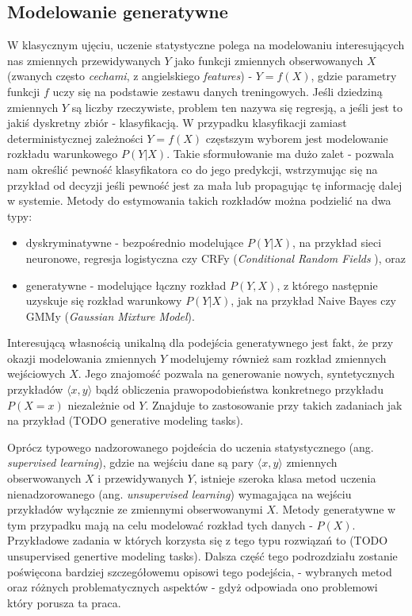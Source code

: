 \documentclass[magisterska]{pracamgr}
\renewcommand{\cite}{\citep}
\begin{document}
\subsection{Modelowanie generatywne}

W klasycznym ujęciu, uczenie statystyczne polega na modelowaniu interesujących nas zmiennych przewidywanych $Y$ jako funkcji zmiennych obserwowanych $X$ (zwanych często \textit{cechami}, z angielskiego \textit{features}) - $Y = f(X)$, gdzie parametry funkcji $f$ uczy się na podstawie zestawu danych treningowych. Jeśli dziedziną zmiennych $Y$ są liczby rzeczywiste, problem ten nazywa się regresją, a jeśli jest to jakiś dyskretny zbiór - klasyfikacją. W przypadku klasyfikacji zamiast deterministycznej zależności $Y = f(X)$ częstszym wyborem jest modelowanie rozkładu warunkowego $P(Y|X)$. Takie sformułowanie ma dużo zalet - pozwala nam określić pewność klasyfikatora co do jego predykcji, wstrzymując się na przykład od decyzji jeśli pewność jest za mała lub propagując tę informację dalej w systemie. Metody do estymowania takich rozkładów można podzielić na dwa typy:
\begin{itemize}
    \setlength\itemsep{0em}
    \item dyskryminatywne - bezpośrednio modelujące $P(Y|X)$, na przykład sieci neuronowe, regresja logistyczna czy CRFy (\textit{Conditional Random Fields} \cite{Lafferty2001ConditionalRF}), oraz
    \item generatywne - modelujące łączny rozkład $P(Y, X)$, z którego następnie uzyskuje się rozkład warunkowy $P(Y|X)$, jak na przykład Naive Bayes czy GMMy (\textit{Gaussian Mixture Model}).
\end{itemize}
Interesującą własnością unikalną dla podejścia generatywnego jest fakt, że przy okazji modelowania zmiennych $Y$ modelujemy również sam rozkład zmiennych wejściowych $X$. Jego znajomość pozwala na generowanie nowych, syntetycznych przykładów $\langle x, y \rangle$ bądź obliczenia prawopodobieństwa konkretnego przykładu $P(X = x)$ niezależnie od $Y$. Znajduje to zastosowanie przy takich zadaniach jak na przykład (TODO generative modeling tasks).

Oprócz typowego nadzorowanego pojdeścia do uczenia statystycznego (ang. \textit{supervised learning}), gdzie na wejściu dane są pary $\langle x, y \rangle$ zmiennych obserwowanych $X$ i przewidywanych $Y$, istnieje szeroka klasa metod uczenia nienadzorowanego (ang. \textit{unsupervised learning}) wymagająca na wejściu przykładów wyłącznie ze zmiennymi obserwowanymi $X$. Metody generatywne w tym przypadku mają na celu modelować rozkład tych danych - $P(X)$. Przykładowe zadania w których korzysta się z tego typu rozwiązań to (TODO unsupervised genertive modeling tasks). Dalsza część tego podrozdziału zostanie poświęcona bardziej szczegółowemu opisowi tego podejścia, - wybranych metod oraz różnych problematycznych aspektów - gdyż odpowiada ono problemowi który porusza ta praca.
\end{document}
